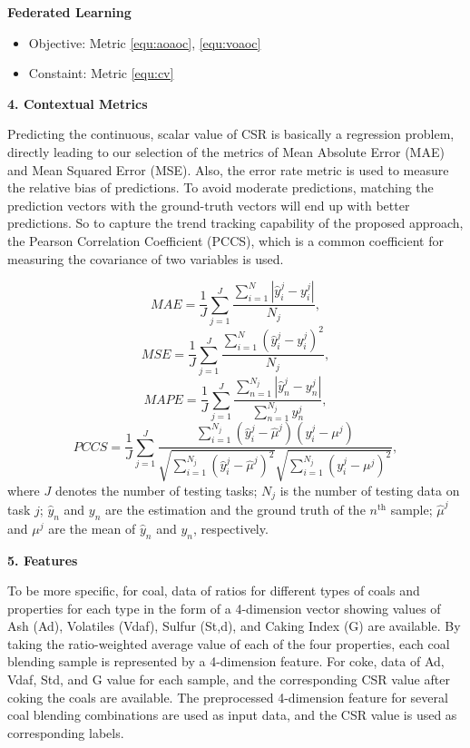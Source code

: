 \vspace{0.2cm}
\noindent \textbf{Federated Learning}
\begin{itemize}
    \item Objective: Metric \ref{equ:aoaoc}, \ref{equ:voaoc}
    \item Constaint: Metric \ref{equ:cv}
\end{itemize}

\noindent
\textbf{4. Contextual Metrics} 

Predicting the continuous, scalar value of CSR is basically a regression problem, directly leading to our selection of the metrics of Mean Absolute Error (MAE) and Mean Squared Error (MSE). Also, the error rate metric is used to measure the relative bias of predictions. 
To avoid moderate predictions, matching the prediction vectors with the ground-truth vectors will end up with better predictions.
So to capture the trend tracking capability of the proposed approach, the Pearson Correlation Coefficient (PCCS), which is a common coefficient for measuring the covariance of two variables is used.

\begin{equation} \label{equ:mae} 
MAE = \frac{1}{J} \sum^J_{j=1} \frac{\sum_{i=1}^N |\hat{y}^{j}_{i} - y^{j}_{i}|}{N_j}, 
\end{equation}
\begin{equation} \label{equ:mse} 
MSE = \frac{1}{J} \sum^J_{j=1} \frac{\sum_{i=1}^N (\hat{y}^{j}_{i} - y^{j}_{i})^2}{N_j},
\end{equation}
\begin{equation} \label{equ:er} 
MAPE = \frac{1}{J} \sum^J_{j=1} \frac{\sum_{n=1}^{N_j} |\hat{y}^j_n - y^j_n|}{\sum_{n=1}^{N_j} y^j_n}, 
\end{equation}
\begin{equation} \label{equ:pccs} 
PCCS = \frac{1}{J} \sum^J_{j=1} \frac{\sum_{i=1}^{N_j} (\hat{y}^{j}_{i} - \hat{\mu}^j)(y^{j}_{i} - \mu^j)}{\sqrt{\sum_{i=1}^{N_j} (\hat{y}^{j}_{i} - \hat{\mu}^j)^2}\sqrt{\sum_{i=1}^{N_j}(y^{j}_{i} - \mu^j)^2}},
\end{equation}
where $J$ denotes the number of testing tasks; $N_j$ is the number of testing data on task $j$; $\hat{y}_n$ and $y_n$ are the estimation and the ground truth of the $n^\text{th}$ sample; $\hat{\mu}^j$ and $\mu^j$ are the mean of $\hat{y}_n$ and $y_n$, respectively.



\noindent
\textbf{5. Features}

To be more specific, for coal, data of ratios for different types of coals and properties for each type in the form of a 4-dimension vector showing values of Ash (Ad), Volatiles (Vdaf), Sulfur (St,d), and Caking Index (G) are available. By taking the ratio-weighted average value of each of the four properties, each coal blending sample is represented by a 4-dimension feature. For coke, data of Ad, Vdaf, Std, and G value for each sample, and the corresponding CSR value after coking the coals are available. The preprocessed 4-dimension feature for several coal blending combinations are used as input data, and the CSR value is used as corresponding labels. 

